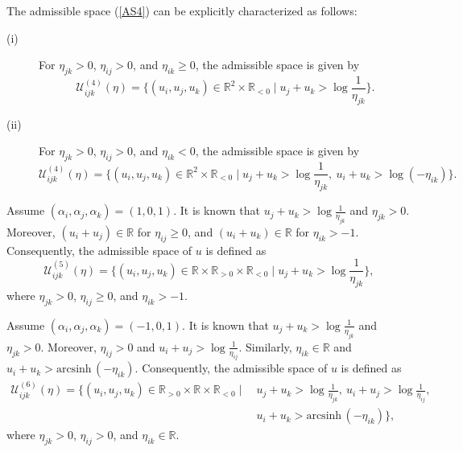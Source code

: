 \documentclass[12pt]{amsart}
\theoremstyle{definition}
\begin{document}
\begin{description}
The admissible space (\ref{AS4}) can be explicitly characterized as follows:
\begin{description}
\item[(i)]For $\eta_{jk}>0$, $\eta_{ij}>0$, and $\eta_{ik}\geq0$, the admissible space is given by
\begin{equation}\label{Eq: F48}
\mathcal{U}^{(4)}_{ijk}(\eta)
=\{(u_i,u_j,u_k)\in \mathbb{R}^2\times\mathbb{R}_{<0}\mid u_j+u_k>\log \frac{1}{\eta_{jk}}\}.
\end{equation}
\item[(ii)]For $\eta_{jk}>0$, $\eta_{ij}>0$, and $\eta_{ik}<0$, the admissible space is given by
\begin{equation}\label{Eq: F42}
\mathcal{U}^{(4)}_{ijk}(\eta)
=\{(u_i,u_j,u_k)\in \mathbb{R}^2\times\mathbb{R}_{<0}\mid u_j+u_k>\log \frac{1}{\eta_{jk}},\  u_i+u_k>\log(-\eta_{ik})\}.
\end{equation}
\end{description}

\item[(V)]
Assume $(\alpha_i,\alpha_j,\alpha_k)=(1,0,1)$.
It is known that $u_j+u_k>\log \frac{1}{\eta_{jk}}$ and $\eta_{jk}>0$.
Moreover, $(u_i+u_j)\in \mathbb{R}$ for $\eta_{ij}\geq0$, and $(u_i+u_k)\in \mathbb{R}$ for $\eta_{ik}> -1$.
Consequently, the admissible space of $u$ is defined as
\begin{equation}\label{AS5}
\mathcal{U}^{(5)}_{ijk}(\eta)
=\{(u_i,u_j,u_k)\in \mathbb{R}\times\mathbb{R}_{>0}\times\mathbb{R}_{<0}
\mid u_j+u_k>\log \frac{1}{\eta_{jk}}\},
\end{equation}
where $\eta_{jk}>0$, $\eta_{ij}\geq0$, and $\eta_{ik}>-1$.

\item[(VI)]
Assume $(\alpha_i,\alpha_j,\alpha_k)=(-1,0,1)$.
It is known that $u_j+u_k>\log \frac{1}{\eta_{jk}}$ and $\eta_{jk}>0$.
Moreover, $\eta_{ij}>0$ and $u_i+u_j>\log\frac{1}{\eta_{ij}}$. 
Similarly, $\eta_{ik}\in \mathbb{R}$ and $u_i+u_k>\mathrm{arcsinh}\, (-\eta_{ik})$.
Consequently, the admissible space of $u$ is defined as
\begin{equation*}
\begin{aligned}
\mathcal{U}^{(6)}_{ijk}(\eta)
=\{(u_i,u_j,u_k)\in \mathbb{R}_{>0}\times\mathbb{R}\times\mathbb{R}_{<0}
\mid &\ u_j+u_k>\log \frac{1}{\eta_{jk}},\
u_i+u_j>\log\frac{1}{\eta_{ij}}, \\ &\ u_i+u_k>\mathrm{arcsinh}\, (-\eta_{ik}) \},
\end{aligned}
\end{equation*}
where $\eta_{jk}>0$, $\eta_{ij}>0$, and $\eta_{ik}\in \mathbb{R}$.


\end{description}
\end{document}
